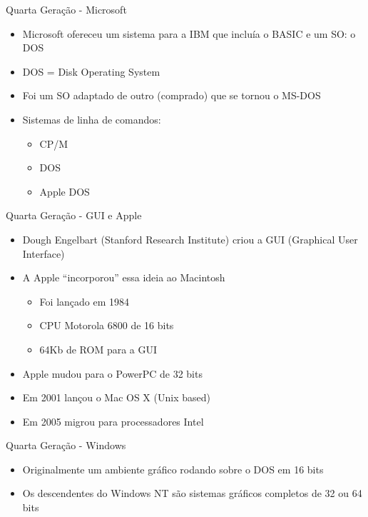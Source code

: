 \documentclass{beamer}
\begin{document}
  \begin{frame}{Quarta Geração - Microsoft}
      \begin{itemize}
          \item Microsoft ofereceu um sistema para a IBM que incluía o BASIC e um SO: o DOS
          \item DOS = Disk Operating System
          \item Foi um SO adaptado de outro (comprado) que se tornou o MS-DOS
          \item Sistemas de linha de comandos:
                \begin{itemize}
                    \item CP/M
                    \item DOS
                    \item Apple DOS
                \end{itemize}
      \end{itemize}
  \end{frame}
  \begin{frame}{Quarta Geração - GUI e Apple}
      \begin{itemize}
          \item Dough Engelbart (Stanford Research Institute) criou a GUI (Graphical User Interface)
          \item A Apple “incorporou” essa ideia ao Macintosh
                \begin{itemize}
                    \item Foi lançado em 1984
                    \item CPU Motorola 6800 de 16 bits
                    \item 64Kb de ROM para a GUI
                \end{itemize}
          \item Apple mudou para o PowerPC de 32 bits
          \item Em 2001 lançou o Mac OS X (Unix based)
          \item Em 2005 migrou para processadores Intel
      \end{itemize}
  \end{frame}
  \begin{frame}{Quarta Geração - Windows}
      \begin{itemize}
          \item Originalmente um ambiente gráfico rodando sobre o DOS em 16 bits
          \item Os descendentes do Windows NT são sistemas gráficos completos de 32 ou 64 bits
      \end{itemize}
  \end{frame}
\end{document}
